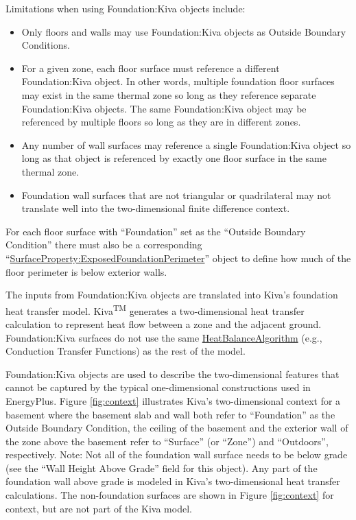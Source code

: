 Limitations when using Foundation:Kiva objects include:

\begin{itemize}
\tightlist
\item
  Only floors and walls may use Foundation:Kiva objects as Outside
  Boundary Conditions.
\item
  For a given zone, each floor surface must reference a different Foundation:Kiva object. In other words, multiple foundation floor surfaces may exist in the same thermal zone so long as they reference separate Foundation:Kiva objects. The same Foundation:Kiva object may be referenced by multiple floors so long as they are in different zones.
\item
  Any number of wall surfaces may reference a single Foundation:Kiva object so long as that object is referenced by exactly one floor surface in the same thermal zone.
\item
  Foundation wall surfaces that are not triangular or quadrilateral may not
  translate well into the two-dimensional finite difference context.
\end{itemize}

For each floor surface with ``Foundation'' set as the ``Outside Boundary Condition''
there must also be a corresponding ``\hyperref[surfaceproperty-exposedfoundationperimeter]{SurfaceProperty:ExposedFoundationPerimeter}''
object to define how much of the floor perimeter is below exterior walls.

The inputs from Foundation:Kiva objects are translated into Kiva's
foundation heat transfer model. Kiva\textsuperscript{TM} generates a
two-dimensional heat transfer calculation to represent heat flow between
a zone and the adjacent ground. Foundation:Kiva surfaces do not use the
same \hyperref[heatbalancealgorithm]{HeatBalanceAlgorithm} (e.g., Conduction Transfer Functions) as the
rest of the model.

Foundation:Kiva objects are used to describe the two-dimensional
features that cannot be captured by the typical one-dimensional
constructions used in EnergyPlus. Figure \ref{fig:context} illustrates
Kiva's two-dimensional context for a basement where the basement slab
and wall both refer to ``Foundation'' as the Outside Boundary Condition,
the ceiling of the basement and the exterior wall of the zone above the
basement refer to ``Surface'' (or ``Zone'') and ``Outdoors'',
respectively. Note: Not all of the foundation wall surface needs to be
below grade (see the ``Wall Height Above Grade'' field for this object).
Any part of the foundation wall above grade is modeled in Kiva's
two-dimensional heat transfer calculations. The non-foundation surfaces
are shown in Figure \ref{fig:context} for context, but are not part of the
Kiva model.

